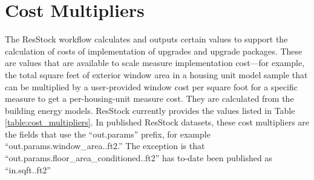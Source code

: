 \section{Cost Multipliers}
The ResStock workflow calculates and outputs certain values to support the calculation of costs of implementation of upgrades and upgrade packages. These are values that are available to scale measure implementation cost---for example, the total square feet of exterior window area in a housing unit model sample that can be multiplied by a user-provided window cost per square foot for a specific measure to get a per-housing-unit measure cost. They are calculated from the building energy models. ResStock currently provides the values listed in Table \ref{table:cost_multipliers}. In published ResStock datasets, these cost multipliers are the fields that use the ``out.params'' prefix, for example ``out.params.window\_area..ft2.'' The exception is that ``out.params.floor\_area\_conditioned..ft2'' has to-date been published as ``in.sqft..ft2''

